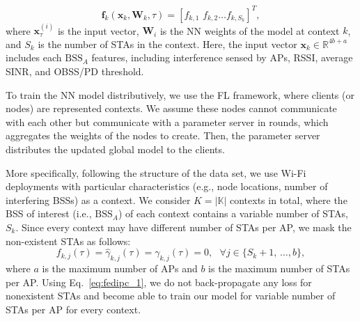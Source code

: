 \documentclass[10pt,a4paper,twocolumn]{article}
\DeclareMathOperator*{\argmax}{arg\,max}
\renewcommand{\vec}[1]{\boldsymbol{#1}}
\newcommand{\ITUpar}{\vspace{8pt}\par}
\begin{document}

\begin{equation}
\vec{f}_{k} (\vec{x}_{k}, \vec{W}_k, \tau ) = \left[ f_{k,1}\, \, f_{k,2} \ldots f_{k,S_k} \right]^T,
\end{equation}
where $\vec{x}_\tau^{(i)}$ is the input vector, $\vec{W}_i$ is the NN weights of the model at context $k$, and $S_k$ is the number of STAs in the context. Here, the input vector $\vec{x}_{k} \in \mathbb{R}^{4b+a}$ includes each $\mathrm{BSS}_A$ features, including interference sensed by APs, RSSI, average SINR, and OBSS/PD threshold.\ITUpar

To train the NN model distributively, we use the FL framework, where clients (or nodes) are represented contexts. We assume these nodes cannot communicate with each other but communicate with a parameter server in rounds, which aggregates the weights of the nodes to create. Then, the parameter server distributes the updated global model to the clients.\ITUpar

More specifically, following the structure of the data set, we use Wi-Fi deployments with particular characteristics (e.g., node locations, number of interfering BSSs) as a context. We consider $K = |\mathbb{K}|$ contexts in total, where the BSS of interest (i.e., $\mathrm{BSS}_A$) of each context contains a variable number of STAs, $S_k$. Since every context may have different number of STAs per AP, we mask the non-existent STAs as follows:
\begin{equation*}
\label{eq:fedipc_1}
f_{k,j}(\tau) = \hat{\gamma}_{k,j}(\tau) = \gamma_{k,j}(\tau) = 0 , \, \, \, \, \forall j \in \{S_k + 1, \, \ldots , b \},
\end{equation*}
where $a$ is the maximum number of APs and $b$ is the maximum number of STAs per AP. Using Eq.~\eqref{eq:fedipc_1}, we do not back-propagate any loss for nonexistent STAs and become able to train our model for variable number of STAs per AP for every context. \ITUpar
\end{document}
